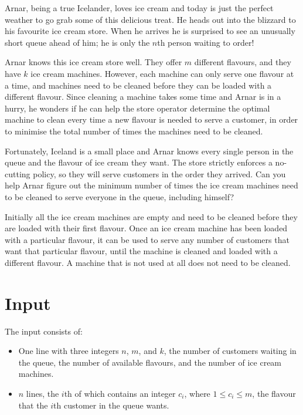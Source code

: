Arnar, being a true Icelander, loves ice cream and today is just the perfect
weather to go grab some of this delicious treat. He heads out into the blizzard
to his favourite ice cream store. When he arrives he is surprised to see an
unusually short queue ahead of him; he is only the $n$th person waiting to
order!

Arnar knows this ice cream store well. They offer $m$ different flavours, and
they have $k$ ice cream machines. However, each machine can only serve one
flavour at a time, and machines need to be cleaned before they can be loaded
with a different flavour. Since cleaning a machine takes some time and Arnar is
in a hurry, he wonders if he can help the store operator determine the optimal
machine to clean every time a new flavour is needed to serve a customer, in
order to minimise the total number of times the machines need to be cleaned.

Fortunately, Iceland is a small place and Arnar knows every single person in
the queue and the flavour of ice cream they want. The store strictly enforces
a no-cutting policy, so they will serve customers in the order they arrived.
Can you help Arnar figure out the minimum number of times the ice cream
machines need to be cleaned to serve everyone in the queue, including himself?

Initially all the ice cream machines are empty and need to be cleaned before
they are loaded with their first flavour. Once an ice cream machine has been
loaded with a particular flavour, it can be used to serve any number of
customers that want that particular flavour, until the machine is cleaned and
loaded with a different flavour. A machine that is not used at all does not
need to be cleaned.

\section*{Input}
The input consists of:
\begin{itemize}
  \item One line with three integers $n$, $m$, and $k$, the number of
    customers waiting in the queue, the number of available flavours, and the
    number of ice cream machines.
  \item $n$ lines, the $i$th of which contains an integer $c_i$, where $1 \leq c_i
    \leq m$, the flavour that the $i$th customer in the queue wants.
\end{itemize}

